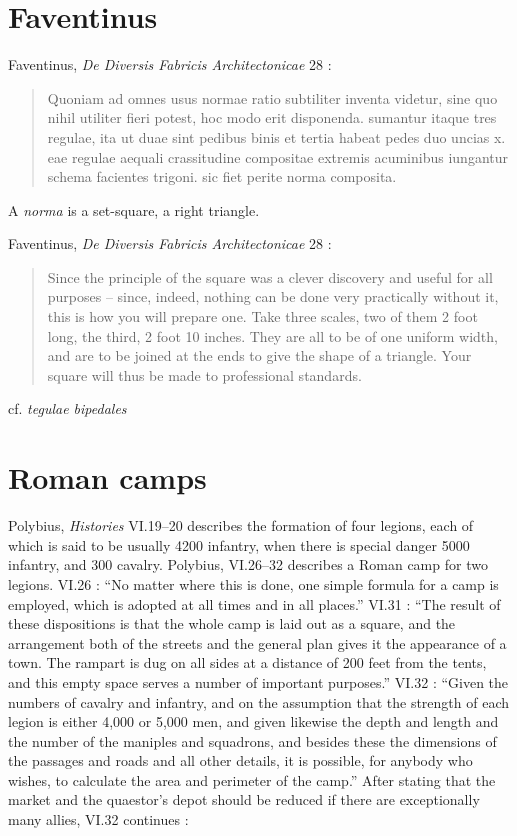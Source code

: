 \documentclass{article}
\theoremstyle{definition}
\begin{document}
\section{Faventinus}
Faventinus, {\em De Diversis Fabricis Architectonicae} 28 \cite[p.~80]{plommer}:

\begin{quote}
Quoniam ad omnes usus normae ratio subtiliter inventa videtur, sine quo nihil utiliter fieri potest, hoc modo erit disponenda. sumantur itaque tres regulae, ita ut duae
sint pedibus binis et tertia habeat pedes duo uncias x. eae regulae aequali crassitudine compositae extremis acuminibus iungantur schema facientes trigoni. sic
fiet perite norma composita.
\end{quote}

A {\em norma} is a set-square, a right triangle.

Faventinus, {\em De Diversis Fabricis Architectonicae} 28 \cite[p.~81]{plommer}:

\begin{quote}
Since the principle of the square was a clever discovery and useful for all purposes -- since, indeed, nothing can be done very practically without it,
this is how you will prepare one. Take three scales, two of them 2 foot long, the third, 2 foot 10 inches. They are all to be of one uniform width, and are to be joined
at the ends to give the shape of a triangle. Your square will thus be made to professional standards.
\end{quote}

cf. {\em tegulae bipedales}






\section{Roman  camps}
Polybius, {\em Histories} VI.19--20 describes the formation of four legions, each of which is
said  to be usually 4200 infantry, when there is special danger 5000 infantry, and 300 cavalry.
Polybius,  VI.26--32 \cite[pp.~324--329, 553]{polybius} describes a Roman  camp for two legions. VI.26 \cite[p.~324]{polybius}: ``No matter where this is done, one simple formula for a camp is employed,
which is adopted at all times and in all places.''
VI.31 \cite[p.~328]{polybius}: ``The result of these dispositions is that the whole camp is laid out as a square, and the arrangement both
of the streets and the general plan gives it the appearance of a town. The rampart is dug on all sides at a distance of 200 feet from the tents, and this empty space
serves a number of important purposes.''
VI.32 \cite[p.~328]{polybius}: ``Given the numbers of cavalry and infantry, and on the assumption that the strength of each legion is either 4,000 or 5,000 men, and given
likewise the depth and length and the number of the maniples and squadrons, and besides these the dimensions of the passages and roads and all other details,
it is possible, for anybody who wishes, to calculate the area and perimeter of the camp.'' After stating that the market and the quaestor's depot should be reduced
if there are exceptionally many allies, VI.32  continues \cite[pp.~328--329]{polybius}:
\end{document}
